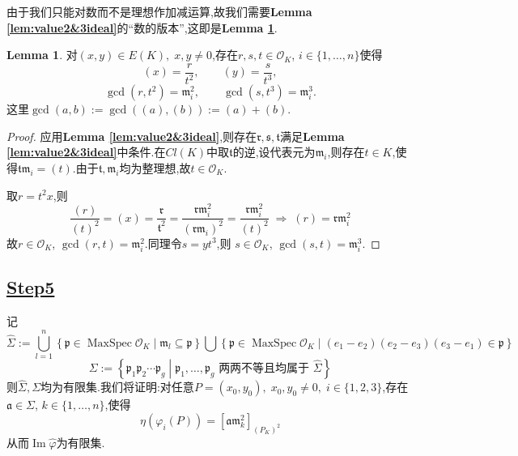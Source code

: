 \documentclass[12pt,A4paper,oneside,reqno]{amsart}
\numberwithin{equation}{section}
\theoremstyle{definition}
\newtheorem{lemma}[theorem]{Lemma}
\theoremstyle{plain}
\theoremstyle{plain}
\numberwithin{equation}{section}
\theoremstyle{remark}
\DeclareMathOperator{\Img}{\operatorname{Im}}
\newcommand{\MaxSpec}{\operatorname{MaxSpec}}
\begin{document}
由于我们只能对数而不是理想作加减运算,故我们需要\textbf{Lemma \ref{lem:value2&3ideal}}的“数的版本”,这即是\textbf{Lemma \ref{lem:value2&3number}}.
\begin{lemma}\label{lem:value2&3number}
	对$(x,y) \in E(K), \;x,y\neq 0$,存在$r,s,t \in \mathcal{O}_K$, $i \in \{1,\ldots,n\}$使得
	$$(x)=\frac{r}{t^2}, \qquad (y)=\frac{s}{t^3}, $$
	$$\gcd(r,t^2)=\mathfrak{m}_i^2, \qquad \gcd (s,t^3)=\mathfrak{m}_i^3.$$
	这里$\gcd(a,b):=\gcd((a),(b)):=(a)+(b)$.
\end{lemma}
\begin{proof}
	应用\textbf{Lemma \ref{lem:value2&3ideal}},则存在$\mathfrak{r},\mathfrak{s},\mathfrak{t}$满足\textbf{Lemma \ref{lem:value2&3ideal}}中条件.在$Cl(K)$中取$\mathfrak{t}$的逆,设代表元为$\mathfrak{m}_i$,则存在$t \in K$,使得$\mathfrak{t}\mathfrak{m}_i=(t)$.由于$\mathfrak{t},\mathfrak{m}_i$均为整理想,故$t \in \mathcal{O}_K$.
	
	取$r=t^2x$,则
	$$\frac{(r)}{(t)^2}=(x)=\frac{\mathfrak{r}}{\mathfrak{t}^2}=\frac{\mathfrak{r}\mathfrak{m}_i^2}{(\mathfrak{r}\mathfrak{m}_i)^2}=\frac{\mathfrak{r}\mathfrak{m}_i^2}{(t)^2} \;\Longrightarrow\; (r)=\mathfrak{r}\mathfrak{m}_i^2$$
	故$r \in \mathcal{O}_K$, $\gcd (r,t)= \mathfrak{m}_i^2$.同理令$s=yt^3$,则 $s \in \mathcal{O}_K$, $\gcd (s,t)= \mathfrak{m}_i^3$.
\end{proof}
\subsection*{\underline{Step5}}
记
$$\hat{\Sigma}:=\bigcup_{l=1}^n\left\{\mathfrak{p} \in \MaxSpec \mathcal{O}_K \middle| \mathfrak{m}_l\subseteq\mathfrak{p} \right\} \bigcup \left\{\mathfrak{p} \in \MaxSpec \mathcal{O}_K \middle| (e_1-e_2)(e_2-e_3)(e_3-e_1) \in \mathfrak{p} \right\}$$
$$\Sigma:=\left\{\mathfrak{p}_1\mathfrak{p}_2\cdots \mathfrak{p}_g  \middle| \mathfrak{p}_1,\ldots ,\mathfrak{p}_g \text{ 两两不等且均属于 }\hat{\Sigma} \right\}$$
则$\hat{\Sigma},\Sigma$均为有限集.我们将证明:对任意$P=(x_0,y_0),\; x_0,y_0 \neq 0,\; i \in \{1,2,3\}$,存在$\mathfrak{a} \in \Sigma$, $k \in \{1,\ldots,n\}$,使得
$$\eta(\varphi_i(P))=\left[\mathfrak{a}\mathfrak{m}_k^2\right]_{(P_K)^2}$$
从而$\Img \hat{\varphi}$为有限集.
\end{document}
